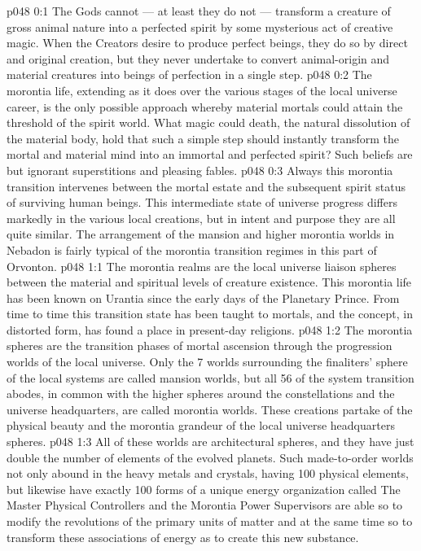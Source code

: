 \author{Archangel}
\vs p048 0:1 The Gods cannot --- at least they do not --- transform a creature of gross animal nature into a perfected spirit by some mysterious act of creative magic. When the Creators desire to produce perfect beings, they do so by direct and original creation, but they never undertake to convert animal\hyp{}origin and material creatures into beings of perfection in a single step.
\vs p048 0:2 The morontia life, extending as it does over the various stages of the local universe career, is the only possible approach whereby material mortals could attain the threshold of the spirit world. What magic could death, the natural dissolution of the material body, hold that such a simple step should instantly transform the mortal and material mind into an immortal and perfected spirit? Such beliefs are but ignorant superstitions and pleasing fables.
\vs p048 0:3 Always this morontia transition intervenes between the mortal estate and the subsequent spirit status of surviving human beings. This intermediate state of universe progress differs markedly in the various local creations, but in intent and purpose they are all quite similar. The arrangement of the mansion and higher morontia worlds in Nebadon is fairly typical of the morontia transition regimes in this part of Orvonton.
\vs p048 1:1 The morontia realms are the local universe liaison spheres between the material and spiritual levels of creature existence. This morontia life has been known on Urantia since the early days of the Planetary Prince. From time to time this transition state has been taught to mortals, and the concept, in distorted form, has found a place in present\hyp{}day religions.
\vs p048 1:2 The morontia spheres are the transition phases of mortal ascension through the progression worlds of the local universe. Only the 7 worlds surrounding the finaliters’ sphere of the local systems are called mansion worlds, but all 56 of the system transition abodes, in common with the higher spheres around the constellations and the universe headquarters, are called morontia worlds. These creations partake of the physical beauty and the morontia grandeur of the local universe headquarters spheres.
\vs p048 1:3 All of these worlds are architectural spheres, and they have just double the number of elements of the evolved planets. Such made\hyp{}to\hyp{}order worlds not only abound in the heavy metals and crystals, having 100 physical elements, but likewise have exactly 100 forms of a unique energy organization called  The Master Physical Controllers and the Morontia Power Supervisors are able so to modify the revolutions of the primary units of matter and at the same time so to transform these associations of energy as to create this new substance.
